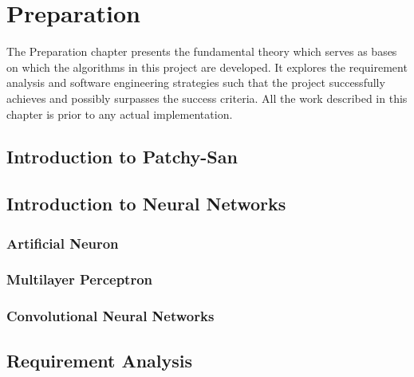 

\chapter{Preparation}

The Preparation chapter presents the fundamental theory which serves as bases on which the algorithms in this project are developed. It explores the requirement analysis and software engineering strategies such that the project successfully achieves and possibly surpasses the success criteria. All the work described in this chapter is prior to any actual implementation.     

\section{Introduction to Patchy-San}

\section{Introduction to Neural Networks}

\subsection{Artificial Neuron}

\subsection{Multilayer Perceptron}

\subsection{Convolutional Neural Networks}


\subsection{}

\subsection{}

\subsection{}

\section{Requirement Analysis}


